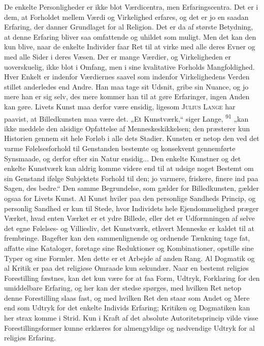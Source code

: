 \documentclass[12pt,a4paper,openany]{book}
\newcommand{\opage}[1]{\marginnote{\footnotesize\textit{[#1]}}}
\begin{document}
De enkelte Personligheder er ikke blot Værdicentra, men Erfaringscentra.
Det er i dem, at Forholdet mellem Værdi og Virkelighed erfares, og det
er jo en saadan Erfaring, der danner Grundlaget for al Religion. Det er
da af største Betydning, at
\opage{192}denne Erfaring bliver saa omfattende og uhildet som muligt.
Men det kan den kun blive, naar de enkelte Individer faar Ret til at
virke med alle deres Evner og med alle Sider i deres Væsen. Der er mange
Værdier, og Virkeligheden er uoverskuelig, ikke blot i Omfang, men i
sine kvalitative Forholds Mangfoldighed. Hver Enkelt er indenfor
Værdiernes saavel som indenfor Virkelighedens Verden stillet anderledes
end Andre. Han maa tage sit Udsnit, gribe sin Nuance, og jo mere han er
sig selv, des mere kommer han til at gøre Erfaringer, ingen Anden kan
gøre. Livets Kunst maa derfor være ensidig, ligesom \textsc{Julius
Lange} har paavist, at Billedkunsten maa være det. „Et Kunstværk,“ siger
Lange, \textsuperscript{91} „kan ikke meddele den alsidige Opfattelse af
Menneskeskikkelsen; den præsterer kun Historien gennem sit hele Forløb i
alle dets Stadier. Kunsten er netop den ved det varme Følelsesforhold
til Genstanden bestemte og konsekvent gennemførte Synsmaade, og derfor
efter sin Natur ensidig... Den enkelte Kunstner og det enkelte Kunstværk
kan aldrig komme videre end til at udsige noget Bestemt om sin Genstand
ifølge Subjektets Forhold til den; jo varmere, friskere, finere ind paa
Sagen, des bedre.“ Den samme Begrundelse, som gælder for Billedkunsten,
gælder ogsaa for Livets Kunst. Al Kunst hviler paa den personlige
Sandheds Princip, og personlig Sandhed er kun til Stede, hvor Individets
hele Ejendommelighed præger Værket, hvad enten Værket er et ydre
Billede, eller det er Udformningen af selve det egne Følelses- og
Villiesliv, det Kunstværk, ethvert Menneske er kaldet til at frembringe.
Bagefter kan den sammenlignende og ordnende Tænkning tage fat, affatte
sine Kataloger, foretage sine Reduktioner og Kombinationer, opstille
sine Typer og sine Formler. Men dette er et Arbejde af anden Rang. Al
Dogmatik og al Kritik er paa det religiøse Omraade kun sekundær. Naar en
bestemt religiøs Forestilling fæstnes, kan det kun være for at faa Form,
Udtryk, Forklaring for den umiddelbare Erfaring, og her kan der stedse
spørges, med hvilken Ret netop denne Forestilling slaas fast, og med
hvilken Ret den staar som Andet og Mere end som Udtryk for det enkelte
Individs Erfaring; Kritiken og Dogmatiken kan her strax komme i Strid.
Kun i Kraft af det absolute Autoritetsprincip vilde visse
Forestillingsformer kunne erklæres for almengyldige og nødvendige Udtryk
for al religiøs Erfaring.
\end{document}
